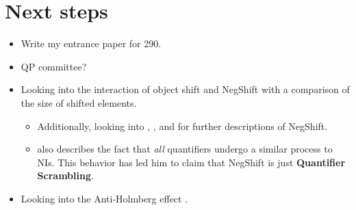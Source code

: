 \documentclass[12pt, letterpaper]{article}
\begin{document}
\section{Next steps} \label{sec:NEXT}
\begin{itemize}
	\item Write my entrance paper for 290.
	\item QP committee?
	\item Looking into the interaction of object shift and NegShift with a comparison of the size of shifted elements.
	\begin{itemize}
		\item Additionally, looking into \citet{christensenInterfacesNegationSyntax2005}, \citet{viknerObjectShiftScandinavian2017,viknerVerbMovementVariation2001}, and \citet{thrainssonSyntaxIcelandic2010} for further descriptions of NegShift.
		\item \citeauthor{thrainssonSyntaxIcelandic2010} also describes the fact that \emph{all} quantifiers undergo a similar process to NIs. This behavior has led him to claim that NegShift is just \textbf{Quantifier Scrambling}.
	\end{itemize}
	\item Looking into the Anti-Holmberg effect \citep{foxCyclicLinearizationSyntactic2005,engelsScandinavianNegativeIndefinites2012}.
\end{itemize}



\printbibliography[heading=bibintoc]
\end{document}
